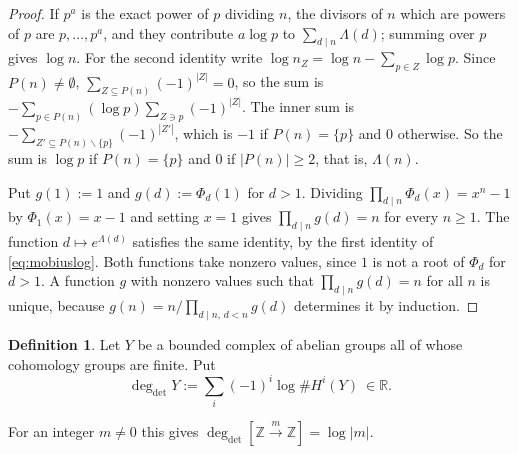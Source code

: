 \documentclass[11pt]{amsart}
\theoremstyle{definition}
\newtheorem{definition}[theorem]{Definition}
\newcommand{\R}{\mathbb R}
\newcommand{\Z}{\mathbb Z}
\newcommand{\degdet}{\operatorname{deg}_{\mathrm{det}}}
\begin{document}
\begin{proof}
If $p^a$ is the exact power of $p$ dividing $n$, the divisors of $n$ which
are powers of $p$ are $p,\dots,p^a$, and they contribute $a\log p$ to
$\sum_{d\mid n}\Lambda(d)$; summing over $p$ gives $\log n$.  For the second
identity write $\log n_Z=\log n-\sum_{p\in Z}\log p$.  Since
$P(n)\ne\emptyset$, $\sum_{Z\subseteq P(n)}(-1)^{|Z|}=0$, so the sum is
$-\sum_{p\in P(n)}(\log p)\sum_{Z\ni p}(-1)^{|Z|}$.  The inner sum is
$-\sum_{Z'\subseteq P(n)\smallsetminus\{p\}}(-1)^{|Z'|}$, which is $-1$ if
$P(n)=\{p\}$ and $0$ otherwise.  So the sum is $\log p$ if $P(n)=\{p\}$ and
$0$ if $|P(n)|\ge2$, that is, $\Lambda(n)$.

Put $g(1):=1$ and $g(d):=\Phi_d(1)$ for $d>1$.  Dividing
$\prod_{d\mid n}\Phi_d(x)=x^n-1$ by $\Phi_1(x)=x-1$ and setting $x=1$ gives
$\prod_{d\mid n}g(d)=n$ for every $n\ge1$.  The function $d\mapsto
e^{\Lambda(d)}$ satisfies the same identity, by the first identity of
\eqref{eq:mobiuslog}.  Both functions take nonzero values, since $1$ is not
a root of $\Phi_d$ for $d>1$.  A function $g$ with nonzero values such that
$\prod_{d\mid n}g(d)=n$ for all $n$ is unique, because
$g(n)=n\big/\prod_{d\mid n,\,d<n}g(d)$ determines it by induction.
\end{proof}

\begin{definition}\label{def:degdet}
Let $Y$ be a bounded complex of abelian groups all of whose cohomology groups
are finite.  Put
\[
  \degdet Y:=\sum_i(-1)^i\log\#H^i(Y)\ \in\R .
\]
\end{definition}

For an integer $m\ne0$ this gives $\degdet[\Z\xrightarrow{m}\Z]=\log|m|$.
\end{document}
